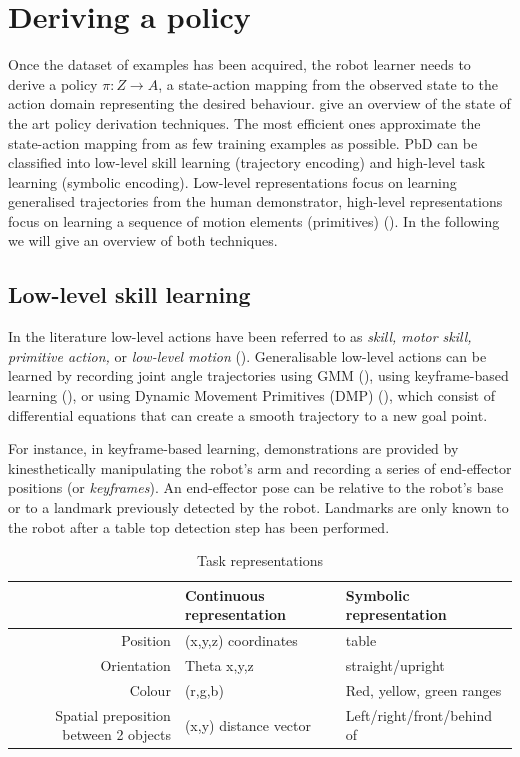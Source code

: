 \section{Deriving a policy}\label{subsec:Deriving a policy}

Once the dataset of examples has been acquired, the robot learner needs to derive a policy $\pi : Z \rightarrow A$, a state-action mapping from the observed state to the action domain representing the desired behaviour. 
\cite{chernova2014robot} give an overview of the state of the art policy derivation techniques.
The most efficient ones approximate the state-action mapping from as few training examples as possible.
PbD can be classified into low-level skill learning (trajectory encoding) and high-level task learning (symbolic encoding).
Low-level representations focus on learning generalised trajectories from the human demonstrator, high-level representations focus on learning a sequence of motion elements (primitives) (\cite{peppoloni2014ros}). In the following we will give an overview of both techniques.


\subsection{Low-level skill learning}
In the literature low-level actions have been referred to as \textit{skill, motor skill, primitive action,} or \textit{low-level motion} (\cite{chernova2014robot}).
Generalisable low-level actions can be learned by recording joint angle trajectories using GMM (\cite{billard2008robot}), using keyframe-based learning (\cite{akgun2012keyframe}), or using Dynamic Movement Primitives (DMP) (\cite{pastor2009learning}), which consist of differential equations that can create a smooth trajectory to a new goal point.

For instance, in keyframe-based learning, demonstrations are provided by kinesthetically manipulating the robot's arm and recording a series of end-effector positions (or \textit{keyframes}). 
An end-effector pose can be relative to the robot's base or to a landmark previously detected by the robot.
Landmarks are only known to the robot after a table top detection step has been performed.

\begin{table}[ht]
\centering
\caption{Task representations}
\label{tab:representations}
\begin{tabular}{r|ll}
 & Continuous representation & Symbolic representation\\ \hline
Position & (x,y,z) coordinates & table \\
Orientation  & Theta x,y,z  & straight/upright \\
Colour & (r,g,b) & Red, yellow, green ranges\\
Spatial preposition between 2 objects & (x,y) distance vector & Left/right/front/behind of 
\end{tabular}
\end{table}

